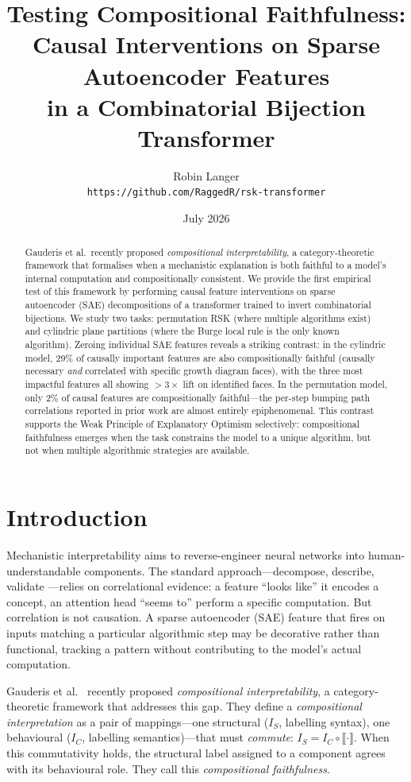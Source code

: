 \documentclass[10pt]{article}
\title{Testing Compositional Faithfulness:\\Causal Interventions on Sparse Autoencoder Features\\in a Combinatorial Bijection Transformer}
\author{Robin Langer\\
\texttt{https://github.com/RaggedR/rsk-transformer}}
\date{July 2026}
\begin{document}
\maketitle

\begin{abstract}
Gauderis et al.\ recently proposed \emph{compositional interpretability},
a category-theoretic framework that formalises when a mechanistic explanation
is both faithful to a model's internal computation and compositionally
consistent. We provide the first empirical test of this framework by
performing causal feature interventions on sparse autoencoder (SAE)
decompositions of a transformer trained to invert combinatorial bijections.
We study two tasks: permutation RSK (where multiple algorithms exist) and
cylindric plane partitions (where the Burge local rule is the only known
algorithm). Zeroing individual SAE features reveals a striking contrast:
in the cylindric model, 29\% of causally important features are also
compositionally faithful (causally necessary \emph{and} correlated with
specific growth diagram faces), with the three most impactful features
all showing $>3\times$ lift on identified faces. In the permutation model,
only 2\% of causal features are compositionally faithful---the per-step
bumping path correlations reported in prior work are almost entirely
epiphenomenal. This contrast supports the Weak Principle of Explanatory
Optimism selectively: compositional faithfulness emerges when the task
constrains the model to a unique algorithm, but not when multiple
algorithmic strategies are available.
\end{abstract}

\section{Introduction}

Mechanistic interpretability aims to reverse-engineer neural networks into
human-understandable components. The standard approach---decompose, describe,
validate \citep{sharkey2025}---relies on correlational evidence: a feature
``looks like'' it encodes a concept, an attention head ``seems to'' perform
a specific computation. But correlation is not causation. A sparse autoencoder
(SAE) feature that fires on inputs matching a particular algorithmic step may
be decorative rather than functional, tracking a pattern without contributing
to the model's actual computation.

Gauderis et al.\ \citep{gauderis2026} recently proposed \emph{compositional
interpretability}, a category-theoretic framework that addresses this gap.
They define a \emph{compositional interpretation} as a pair of mappings---one
structural ($I_S$, labelling syntax), one behavioural ($I_C$, labelling
semantics)---that must \emph{commute}: $I_S = I_C \circ \llbracket \cdot
\rrbracket$. When this commutativity holds, the structural label assigned to
a component agrees with its behavioural role. They call this
\emph{compositional faithfulness}.
\end{document}
